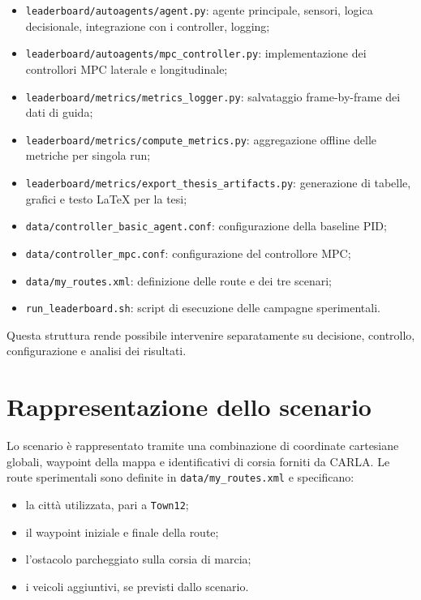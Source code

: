 \begin{itemize}
    \item \texttt{leaderboard/autoagents/agent.py}: agente principale, sensori, logica decisionale, integrazione con i controller, logging;
    \item \texttt{leaderboard/autoagents/mpc\_controller.py}: implementazione dei controllori MPC laterale e longitudinale;
    \item \texttt{leaderboard/metrics/metrics\_logger.py}: salvataggio frame-by-frame dei dati di guida;
    \item \texttt{leaderboard/metrics/compute\_metrics.py}: aggregazione offline delle metriche per singola run;
    \item \texttt{leaderboard/metrics/export\_thesis\_artifacts.py}: generazione di tabelle, grafici e testo LaTeX per la tesi;
    \item \texttt{data/controller\_basic\_agent.conf}: configurazione della baseline PID;
    \item \texttt{data/controller\_mpc.conf}: configurazione del controllore MPC;
    \item \texttt{data/my\_routes.xml}: definizione delle route e dei tre scenari;
    \item \texttt{run\_leaderboard.sh}: script di esecuzione delle campagne sperimentali.
\end{itemize}

Questa struttura rende possibile intervenire separatamente su decisione, controllo, configurazione e analisi dei risultati.

\section{Rappresentazione dello scenario}

Lo scenario è rappresentato tramite una combinazione di coordinate cartesiane globali, waypoint della mappa e identificativi di corsia forniti da CARLA. Le route sperimentali sono definite in \texttt{data/my\_routes.xml} e specificano:

\begin{itemize}
    \item la città utilizzata, pari a \texttt{Town12};
    \item il waypoint iniziale e finale della route;
    \item l'ostacolo parcheggiato sulla corsia di marcia;
    \item i veicoli aggiuntivi, se previsti dallo scenario.
\end{itemize}

